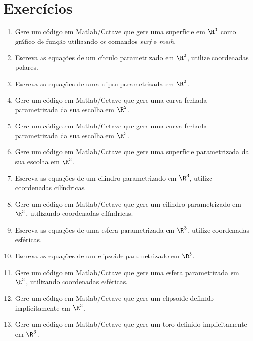 \pagebreak

\section{Exercícios}\label{exerc}

\begin{enumerate}

\item Gere um código em Matlab/Octave  que gere uma superfície em $\R^3$ como gráfico de função utilizando os comandos {\it surf} e {\it mesh}. 

\item Escreva as equações de um círculo parametrizado em $\R^2$, utilize coordenadas polares.

\item Escreva as equações de uma elipse parametrizada em $\R^2$.

\item Gere um código em Matlab/Octave que gere uma curva fechada parametrizada da sua escolha em $\R^2$.

\item Gere um código em Matlab/Octave que gere uma curva fechada parametrizada da sua escolha em $\R^3$.

\item Gere um código em Matlab/Octave que gere uma superfície parametrizada da sua escolha em $\R^3$.

\item Escreva as equações de um cilindro parametrizado em $\R^3$, utilize coordenadas cilíndricas.

\item Gere um código em Matlab/Octave que gere um cilindro parametrizado em $\R^3$, utilizando coordenadas cilíndricas.

\item Escreva as equações de uma esfera parametrizada em $\R^3$, utilize coordenadas esféricas.

\item Escreva as equações de um elipsoide parametrizado em $\R^3$.

\item Gere um código em Matlab/Octave que gere uma esfera parametrizada em $\R^3$, utilizando coordenadas esféricas.

\item Gere um código em Matlab/Octave que gere um elipsoide definido implicitamente em $\R^3$.

\item Gere um código em Matlab/Octave que gere um toro definido implicitamente em $\R^3$.

\end{enumerate}
